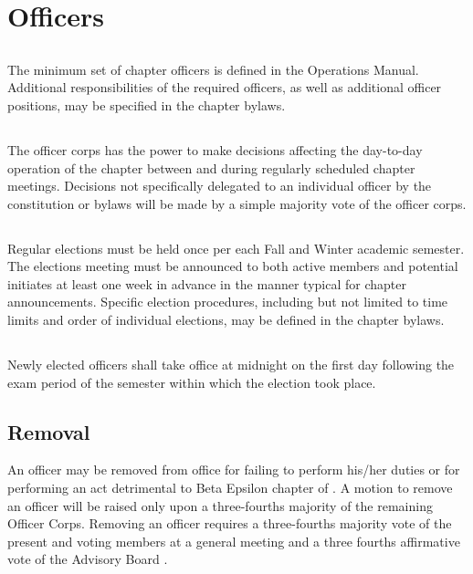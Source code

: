 \chapter{Officers}\label{sec:officers}

\section{}
The minimum set of chapter officers is defined in the \hkn Operations Manual. Additional responsibilities of the required officers, as well as additional officer positions, may be specified in the chapter bylaws.

\section{}
The officer corps has the power to make decisions affecting the day-to-day operation of the chapter between and during regularly scheduled chapter meetings. Decisions not specifically delegated to an individual officer by the constitution or bylaws will be made by a simple majority vote of the officer corps.

\section{}
Regular elections must be held once per each Fall and Winter academic semester. The elections meeting must be announced to both active members and potential initiates at least one week in advance in the manner typical for chapter announcements. Specific election procedures, including but not limited to time limits and order of individual elections, may be defined in the chapter bylaws.

\section{}
Newly elected officers shall take office at midnight on the first day following the exam period of the semester within which the election took place.

\section{Removal}
 An officer may be removed from office for failing to perform his/her duties or for performing an act detrimental to Beta Epsilon chapter of \hkn. A motion to remove an officer will be raised only upon a three-fourths majority of the remaining Officer Corps. Removing an officer requires a three-fourths majority vote of the present and voting members at a general meeting and a three fourths affirmative vote of the Advisory Board .

